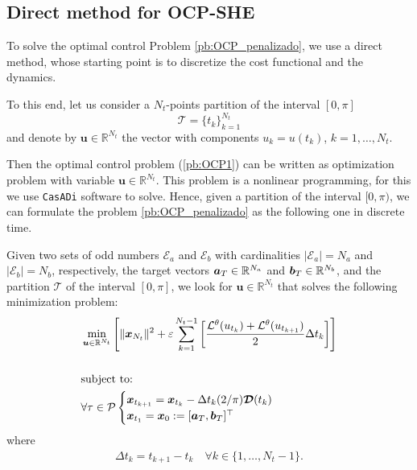 \documentclass[twocolumn]{autart}    %
\begin{document}
\subsection{Direct method  for OCP-SHE}

To solve the optimal control Problem \ref{pb:OCP_penalizado}, we use a direct method, whose starting point is to discretize the cost functional and the dynamics.

To this end, let us consider a $N_t$-points partition of the interval $[0,\pi]$ 
\begin{displaymath} 
	\mathcal{T} = \{t_k\}_{k=1}^{N_t} 
\end{displaymath}
and denote by $\bm{u} \in \mathbb{R}^{N_t}$ the vector with components $u_k = u(t_k)$, $k=1,\ldots,N_t$.

Then the optimal control problem (\ref{pb:OCP1}) can be written as optimization problem with variable $\bm{u} \in \mathbb{R}^{N_t}$. This problem is a nonlinear programming, for this we use \texttt{CasADi} software to solve. 
%
Hence, given a partition of the interval $[0,\pi)$, we can formulate the problem \ref{pb:OCP_penalizado} as the following one in discrete time.
\newline

\begin{problem}\label{pb:numOCP2}
Given two sets of odd numbers $\mathcal{E}_a$ and $\mathcal{E}_b$ with cardinalities $|\mathcal{E}_a| = N_a$ and $|\mathcal{E}_b| = N_b$, respectively, the target vectors $\bm{a}_T \in \mathbb{R}^{N_a}$ and $\bm{b}_T \in \mathbb{R}^{N_b}$, and the partition $\mathcal{T}$ of the interval $[0,\pi]$, we look for $\bm{u} \in \mathbb{R}^{N_t}$ that solves the following minimization problem:
\begin{align*}
	&\min_{\bm{u} \in \mathbb{R}^{N_t}} \Bigg[\| \bm{x}_{N_t}\|^2 + \varepsilon \sum_{k=1}^{N_t-1} 
	\bigg[\frac{\mathcal{L}^\theta(u_{t_k}) + \mathcal{L}^\theta(u_{t_{k+1}})}{2}\Delta t_k \bigg]  \Bigg]  
	\\[15pt]
    &\notag \text{subject to: } 
    \\
    &\forall \tau \in \mathcal{P} \begin{cases}
    \bm{x}_{t_{k+1}} = \bm{x}_{t_k} - \Delta t_{k} (2/\pi) \bm{\mathcal{D}}(t_k)\\
    \bm{x}_{t_1} = \bm{x}_0:= [\bm{a}_T,\bm{b}_T]^\top
    \end{cases} 
\end{align*}
where 
\begin{gather}
	\Delta t_{k} = t_{k+1} - t_{k} \hspace{1em} \forall k \in \{1,\dots,N_t-1\}.
\end{gather}
\end{problem}
\end{document}
